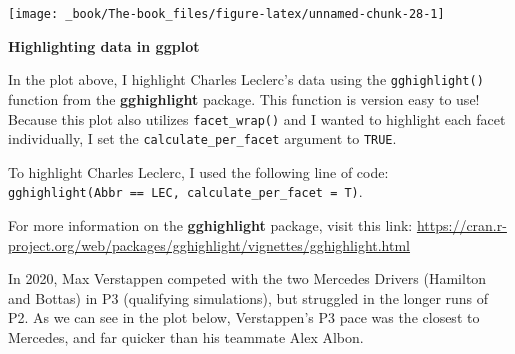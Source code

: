 \documentclass[
]{book}
\begin{document}
\begin{center}\texttt{[image: \_book/The-book\_files/figure-latex/unnamed-chunk-28-1]} \end{center}

\begin{blackbox}

\begin{center}
\textbf{Highlighting data in ggplot}

\end{center}

In the plot above, I highlight Charles Leclerc's data using the \texttt{gghighlight()} function from the \textbf{gghighlight} package. This function is version easy to use! Because this plot also utilizes \texttt{facet\_wrap()} and I wanted to highlight each facet individually, I set the \texttt{calculate\_per\_facet} argument to \texttt{TRUE}.

To highlight Charles Leclerc, I used the following line of code: \texttt{gghighlight(Abbr\ ==\ \textquotesingle{}LEC\textquotesingle{},\ calculate\_per\_facet\ =\ T)}.

For more information on the \textbf{gghighlight} package, visit this link: \url{https://cran.r-project.org/web/packages/gghighlight/vignettes/gghighlight.html}

\end{blackbox}

In 2020, Max Verstappen competed with the two Mercedes Drivers (Hamilton and Bottas) in P3 (qualifying simulations), but struggled in the longer runs of P2. As we can see in the plot below, Verstappen's P3 pace was the closest to Mercedes, and far quicker than his teammate Alex Albon.
\end{document}
